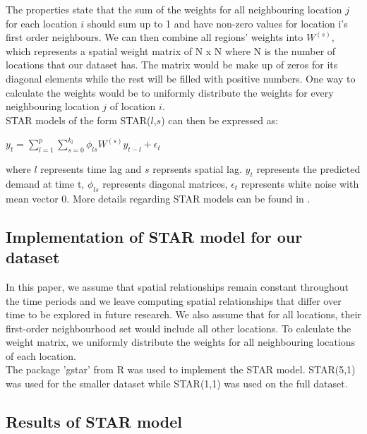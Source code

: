 \documentclass[nonblindrev,msom]{informs3} %
\begin{document}
\noindent The properties state that the sum of the weights for all neighbouring location $j$ for each location $i$ should sum up to 1 and have non-zero values for location i's first order neighbours. We can then combine all regions' weights into $W^{(s)}$, which represents a spatial weight matrix of N x N where N is the number of locations that our dataset has. The matrix would be make up of zeros for its diagonal elements while the rest will be filled with positive numbers. One way to calculate the weights would be to uniformly distribute the weights for every neighbouring location $j$ of location $i$. \\

\newpage
\noindent STAR models of the form STAR($l$,$s$) can then be expressed as: 

\begin{center}
    $\displaystyle y_{t} = \sum_{l=1}^{p}\sum_{s=0}^{k_l}\phi_{ls} W^{(s)}y_{t-l} + \epsilon_{t}$
\end{center}

\noindent where $l$ represents time lag and $s$ reprsents spatial lag. $y_{t}$ represents the predicted demand at time t, $\phi_{ls}$ represents diagonal matrices, $\epsilon_{t}$ represents white noise with mean vector 0. 
More details regarding STAR models can be found in \cite{KURT20152537}.


\subsection{Implementation of STAR model for our dataset}

\noindent In this paper, we assume that spatial relationships remain constant throughout the time periods and we leave computing spatial relationships that differ over time to be explored in future research. We also assume that for all locations, their first-order neighbourhood set would include all other locations. To calculate the weight matrix, we uniformly distribute the weights for all neighbouring locations of each location. \\

\noindent The package 'gstar' from R was used to implement the STAR model. STAR(5,1) was used for the smaller dataset while STAR(1,1) was used on the full dataset.

\subsection{Results of STAR model}
\end{document}
